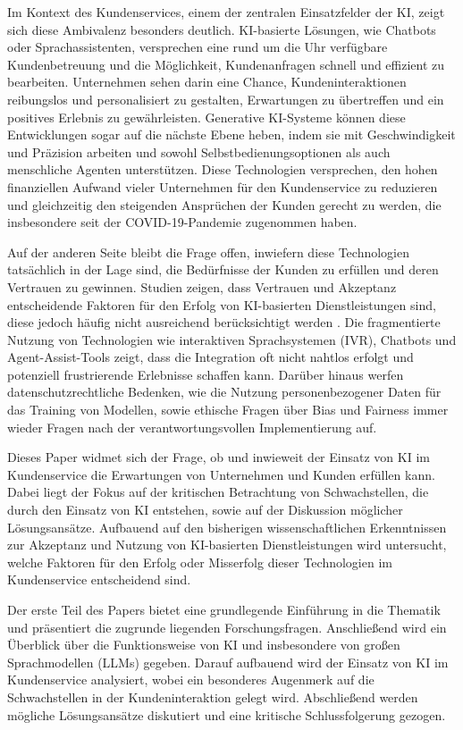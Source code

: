 \documentclass[12pt]{article}
\begin{document}
Im Kontext des Kundenservices, einem der zentralen Einsatzfelder der KI, zeigt sich diese Ambivalenz besonders deutlich.
KI-basierte Lösungen, wie Chatbots oder Sprachassistenten, versprechen eine rund um die Uhr verfügbare Kundenbetreuung und die Möglichkeit, Kundenanfragen schnell und effizient zu bearbeiten.
Unternehmen sehen darin eine Chance, Kundeninteraktionen reibungslos und personalisiert zu gestalten, Erwartungen zu übertreffen und ein positives Erlebnis zu gewährleisten.
Generative KI-Systeme können diese Entwicklungen sogar auf die nächste Ebene heben, indem sie mit Geschwindigkeit und Präzision arbeiten und sowohl Selbstbedienungsoptionen als auch menschliche Agenten unterstützen.
Diese Technologien versprechen, den hohen finanziellen Aufwand vieler Unternehmen für den Kundenservice zu reduzieren und gleichzeitig den steigenden Ansprüchen der Kunden gerecht zu werden, die insbesondere seit der COVID-19-Pandemie zugenommen haben.

Auf der anderen Seite bleibt die Frage offen, inwiefern diese Technologien tatsächlich in der Lage sind, die Bedürfnisse der Kunden zu erfüllen und deren Vertrauen zu gewinnen.
Studien zeigen, dass Vertrauen und Akzeptanz entscheidende Faktoren für den Erfolg von KI-basierten Dienstleistungen sind, diese jedoch häufig nicht ausreichend berücksichtigt werden \cite{rathje_kunstliche_2021}.
Die fragmentierte Nutzung von Technologien wie interaktiven Sprachsystemen (IVR), Chatbots und Agent-Assist-Tools zeigt, dass die Integration oft nicht nahtlos erfolgt und potenziell frustrierende Erlebnisse schaffen kann.
Darüber hinaus werfen datenschutzrechtliche Bedenken, wie die Nutzung personenbezogener Daten für das Training von Modellen, sowie ethische Fragen über Bias und Fairness immer wieder Fragen nach der verantwortungsvollen Implementierung auf.

Dieses Paper widmet sich der Frage, ob und inwieweit der Einsatz von KI im Kundenservice die Erwartungen von Unternehmen und Kunden erfüllen kann.
Dabei liegt der Fokus auf der kritischen Betrachtung von Schwachstellen, die durch den Einsatz von KI entstehen, sowie auf der Diskussion möglicher Lösungsansätze.
Aufbauend auf den bisherigen wissenschaftlichen Erkenntnissen zur Akzeptanz und Nutzung von KI-basierten Dienstleistungen wird untersucht, welche Faktoren für den Erfolg oder Misserfolg dieser Technologien im Kundenservice entscheidend sind.

Der erste Teil des Papers bietet eine grundlegende Einführung in die Thematik und präsentiert die zugrunde liegenden Forschungsfragen.
Anschließend wird ein Überblick über die Funktionsweise von KI und insbesondere von großen Sprachmodellen (LLMs) gegeben.
Darauf aufbauend wird der Einsatz von KI im Kundenservice analysiert, wobei ein besonderes Augenmerk auf die Schwachstellen in der Kundeninteraktion gelegt wird.
Abschließend werden mögliche Lösungsansätze diskutiert und eine kritische Schlussfolgerung gezogen.
\end{document}
